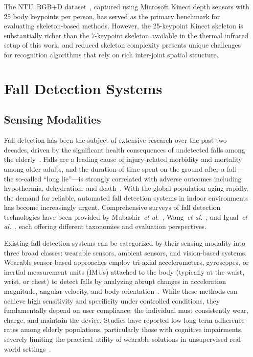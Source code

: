 The NTU~RGB+D dataset~\cite{shahroudy2016ntu}, captured using Microsoft Kinect depth sensors with 25 body keypoints per person, has served as the primary benchmark for evaluating skeleton-based methods. However, the 25-keypoint Kinect skeleton is substantially richer than the 7-keypoint skeleton available in the thermal infrared setup of this work, and reduced skeleton complexity presents unique challenges for recognition algorithms that rely on rich inter-joint spatial structure.

\section{Fall Detection Systems}
\label{sec:rw_fall}

\subsection*{Sensing Modalities}

Fall detection has been the subject of extensive research over the past two decades, driven by the significant health consequences of undetected falls among the elderly~\cite{who2007falls, tinetti1988risk}. Falls are a leading cause of injury-related morbidity and mortality among older adults, and the duration of time spent on the ground after a fall---the so-called ``long lie''---is strongly correlated with adverse outcomes including hypothermia, dehydration, and death~\cite{lord2007falls}. With the global population aging rapidly, the demand for reliable, automated fall detection systems in indoor environments has become increasingly urgent. Comprehensive surveys of fall detection technologies have been provided by Mubashir~\emph{et al.}~\cite{mubashir2013survey}, Wang~\emph{et al.}~\cite{wang2020elderly}, and Igual~\emph{et al.}~\cite{igual2013challenges}, each offering different taxonomies and evaluation perspectives.

Existing fall detection systems can be categorized by their sensing modality into three broad classes: wearable sensors, ambient sensors, and vision-based systems. Wearable sensor-based approaches employ tri-axial accelerometers, gyroscopes, or inertial measurement units (IMUs) attached to the body (typically at the waist, wrist, or chest) to detect falls by analyzing abrupt changes in acceleration magnitude, angular velocity, and body orientation~\cite{mubashir2013survey}. While these methods can achieve high sensitivity and specificity under controlled conditions, they fundamentally depend on user compliance: the individual must consistently wear, charge, and maintain the device. Studies have reported low long-term adherence rates among elderly populations, particularly those with cognitive impairments, severely limiting the practical utility of wearable solutions in unsupervised real-world settings~\cite{lord2007falls}.


